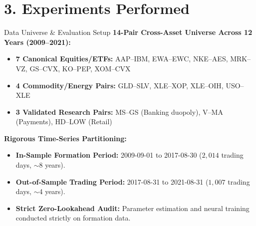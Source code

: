 \documentclass[10pt, aspectratio=169]{beamer}
\begin{document}
\section{3. Experiments Performed}

\begin{frame}{Data Universe \& Evaluation Setup}
  \textbf{14-Pair Cross-Asset Universe Across 12 Years (2009--2021):}
  \vspace{4pt}
  \begin{itemize}
    \item \textbf{7 Canonical Equities/ETFs:} AAP--IBM, EWA--EWC, NKE--AES, MRK--VZ, GS--CVX, KO--PEP, XOM--CVX
    \item \textbf{4 Commodity/Energy Pairs:} GLD--SLV, XLE--XOP, XLE--OIH, USO--XLE
    \item \textbf{3 Validated Research Pairs:} MS--GS (Banking duopoly), V--MA (Payments), HD--LOW (Retail)
  \end{itemize}
  \vspace{4pt}
  \textbf{Rigorous Time-Series Partitioning:}
  \begin{itemize}
    \item \textbf{In-Sample Formation Period:} 2009-09-01 to 2017-08-30 ($2{,}014$ trading days, $\sim$8 years).
    \item \textbf{Out-of-Sample Trading Period:} 2017-08-31 to 2021-08-31 ($1{,}007$ trading days, $\sim$4 years).
    \item \textbf{Strict Zero-Lookahead Audit:} Parameter estimation and neural training conducted strictly on formation data.
  \end{itemize}
\end{frame}
\end{document}
